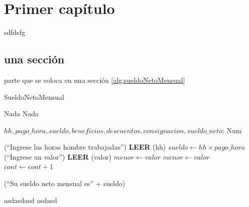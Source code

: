 \documentclass[letterpaper,12pt]{report}
\newcommand{\READ}[1]{\STATE \textbf{LEER} (#1)}
\begin{document}
\tableofcontents

\chapter{Primer cap\'itulo}\label{cap:1}
sdfdsfg

\section{una secci\'on}\label{sec:1}
parte que se coloca en una sección \ref{alg:sueldoNetoMensual}

\begin{algorithm}
\caption{SueldoNetoMensual}
\label{alg:sueldoNetoMensual}
\begin{algorithmic}[1] %
\REQUIRE Nada
\ENSURE Nada

\STATE $hh, pago\_hora, sueldo, beneficios, descuentos, consignacion, sueldo\_neto$: Num

\PRINT (``Ingrese las horas hombre trabajadas'')
\READ {hh}
\STATE $sueldo \gets hh\times pago\_hora$
\PRINT (``Ingrese un valor'')
\READ{valor}
\STATE $menor \gets valor$
\ELSE
{}
\STATE $menor\gets valor$
\ENDIF
\ENDIF
\STATE $cont \gets cont + 1$
\ENDWHILE

\PRINT (``Su sueldo neto mensual es'' + sueldo)

\end{algorithmic}
\end{algorithm}

\newpage
asdasdasd
asdasd
\end{document}
